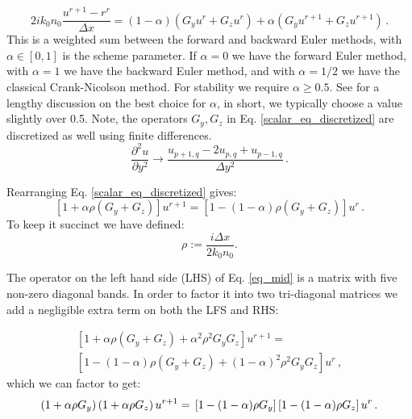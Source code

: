 \documentclass[]{article}
\begin{document}
	\begin{equation}
		2ik_0 n_0 \frac{u^{r+1}-r^r}{\Delta x} = (1-\alpha)\left( G_y u^r+G_z u^r\right) +\alpha\left( G_y u^{r+1}+G_z u^{r+1}\right)\, .
		\label{scalar_eq_discretized}
	\end{equation}
	This is a weighted sum between the forward and backward Euler methods, with $\alpha\in[0,1]$ is the scheme parameter. If $\alpha=0$ we have the forward Euler method, with $\alpha=1$ we have the backward Euler method, and with $\alpha=1/2$ we have the classical Crank-Nicolson method. For stability we require $\alpha \ge 0.5$. See \cite{Lifante_2015} for a lengthy discussion on the best choice for $\alpha$, in short, we typically choose a value slightly over 0.5. Note, the operators $G_y, G_z$ in Eq. \eqref{scalar_eq_discretized} are discretized as well using finite differences.
	\begin{equation}
		\frac{\partial^2 u}{\partial y^2} \to \frac{u_{p+1,q}-2u_{p,q}+u_{p-1,q}}{\Delta y^2}\, .
		\label{double_derivative}
	\end{equation}
	

	Rearranging Eq. \eqref{scalar_eq_discretized} gives:
	\begin{equation}
		\left[1+\alpha \rho(G_y+G_z) \right] u^{r+1} = \left[1-(1-\alpha)\rho(G_y+G_z) \right] u^r \, .
		\label{eq_mid}
	\end{equation}
	To keep it succinct we have defined:
	\begin{equation}
		\rho:=\frac{i\Delta x}{2k_0 n_0}.
		\label{rho_eq}
	\end{equation}
	
	The operator on the left hand side (LHS) of Eq. \eqref{eq_mid} is a matrix with five non-zero diagonal bands. In order to factor it into two tri-diagonal matrices we add a negligible extra term on both the LFS and RHS:
	
	\begin{multline*}
		\left[1+\alpha \rho(G_y+G_z) + \alpha^2 \rho^2 G_y G_z \right] u^{r+1} =\\
		 \left[1-(1-\alpha)\rho (G_y+G_z) +(1-\alpha)^2\rho^2 G_y G_z \right] u^r \, ,
	\end{multline*}
	which we can factor to get:
	\begin{equation}
		\left(1+\alpha \rho G_y \right)\left(1+\alpha \rho G_z \right) u^{r+1} = \\
		\left[1-(1-\alpha)\rho G_y \right]\left[1-(1-\alpha)\rho G_z \right] u^r \, .
		\label{ADI_setup}
	\end{equation}
	
\end{document}
